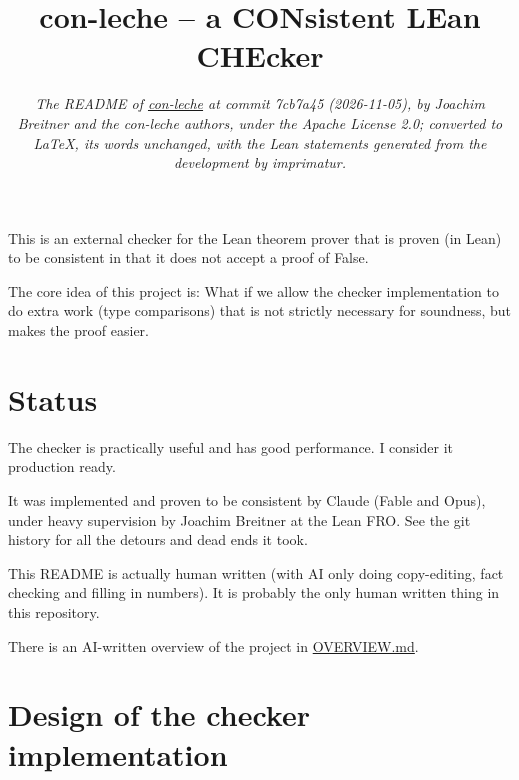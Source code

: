 \documentclass{article}
\title{con-leche – a CONsistent LEan CHEcker}
\author{\parbox{0.85\textwidth}{\centering\normalsize\itshape The README of
  \href{https://github.com/leanprover/con-leche}{con-leche} at commit
  7cb7a45 (2026-11-05), by Joachim Breitner and the con-leche authors, under
  the Apache License 2.0; converted to \LaTeX, its words unchanged, with the
  Lean statements generated from the development by imprimatur.}}
\date{}
\begin{document}
\maketitle

This is an external checker for the Lean theorem prover that is proven (in Lean) to be consistent in that it does not accept a proof of False.

The core idea of this project is: What if we allow the checker implementation to do extra work (type comparisons) that is not strictly necessary for soundness, but makes the proof easier.

\section*{Status}

The checker is practically useful and has good performance. I consider it production ready.

It was implemented and proven to be consistent by Claude (Fable and Opus), under heavy supervision by Joachim Breitner at the Lean FRO. See the git history for all the detours and dead ends it took.

This README is actually human written (with AI only doing copy-editing, fact checking and filling in numbers). It is probably the only human written thing in this repository.

There is an AI-written overview of the project in \href{https://github.com/leanprover/con-leche/blob/master/OVERVIEW.md}{OVERVIEW.md}.

\section*{Design of the checker implementation}
\end{document}
